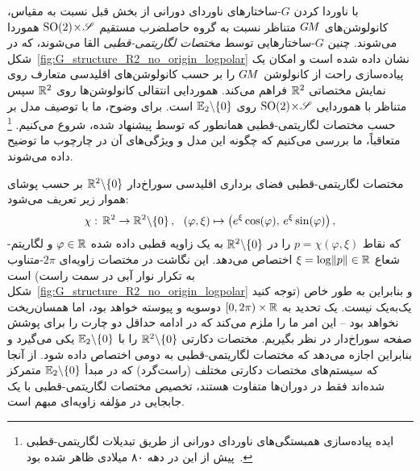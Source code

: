 با ناوردا کردن $G$-ساختارهای ناوردای دورانی از بخش قبل نسبت به مقیاس، کانولوشن‌های $G\mkern-1.4muM$ متناظر نسبت به گروه حاصلضرب مستقیم ${\operatorname{SO}(2) \!\times\! \mathscr{S}}$ هموردا می‌شوند.
چنین $G$-ساختارهایی توسط \emph{مختصات لگاریتمی-قطبی} القا می‌شوند، که در شکل~\ref{fig:G_structure_R2_no_origin_logpolar} نشان داده شده است و امکان یک پیاده‌سازی راحت از کانولوشن $G\mkern-1.4muM$ را بر حسب کانولوشن‌های اقلیدسی متعارف روی نمایش مختصاتی $\mathbb{R}^2$ فراهم می‌کند.
هموردایی انتقالی کانولوشن‌ها روی $\mathbb{R}^2$ سپس متناظر با هموردایی ${\operatorname{SO}(2) \!\times\! \mathscr{S}}$ روی $\mathbb{E}_2 \backslash \{0\}$ است.
برای وضوح، ما با توصیف مدل بر حسب مختصات لگاریتمی-قطبی همانطور که توسط \citet{esteves2017polar} پیشنهاد شده، شروع می‌کنیم.%
\footnote{
	ایده پیاده‌سازی همبستگی‌های ناوردای دورانی از طریق تبدیلات لگاریتمی-قطبی پیش از این در دهه ۸۰ میلادی ظاهر شده بود~\cite{saito1983scale,casasent1987real}.
}
متعاقباً، ما بررسی می‌کنیم که چگونه این مدل و ویژگی‌های آن در چارچوب ما توضیح داده می‌شوند.

مختصات لگاریتمی-قطبی فضای برداری اقلیدسی سوراخ‌دار $\mathbb{R}^2 \backslash \{0\}$ بر حسب پوشای هموار زیر تعریف می‌شود:
\begin{align}
	\chi:\, \R^2 \to \R^2 \backslash \{0\} \,,\ \ 
	(\varphi, \xi) \mapsto \big( e^\xi \cos(\varphi) ,\, e^\xi \sin(\varphi) \big) \,,
\end{align}
که نقاط $p = \chi(\varphi,\xi)$ را در $\mathbb{R}^2 \backslash \{0\}$ به یک زاویه قطبی داده شده $\varphi \in \mathbb{R}$ و لگاریتم-شعاع ${\xi = \log\lVert p\rVert \in \mathbb{R}}$ اختصاص می‌دهد.
این نگاشت در مختصات زاویه‌ای $2\pi$-متناوب است (به تکرار نوار آبی در سمت راست شکل~\ref{fig:G_structure_R2_no_origin_logpolar} توجه کنید) و بنابراین به طور خاص یک‌به‌یک نیست.
یک تحدید به $[0,2\pi) \times \mathbb{R}$ دوسویه و پیوسته خواهد بود، اما همسان‌ریخت نخواهد بود -- این امر ما را ملزم می‌کند که در ادامه حداقل دو چارت را برای پوشش صفحه سوراخ‌دار در نظر بگیریم.
مختصات دکارتی $\mathbb{R}^2 \backslash \{0\}$ را با $\mathbb{E}_2 \backslash \{0\}$ یکی می‌گیرد و بنابراین اجازه می‌دهد که مختصات لگاریتمی-قطبی به دومی اختصاص داده شود.
از آنجا که سیستم‌های مختصات دکارتی مختلف (راست‌گرد) که در مبدأ $\mathbb{E}_2 \backslash \{0\}$ متمرکز شده‌اند فقط در دوران‌ها متفاوت هستند، تخصیص مختصات لگاریتمی-قطبی با یک جابجایی در مؤلفه زاویه‌ای مبهم است.

